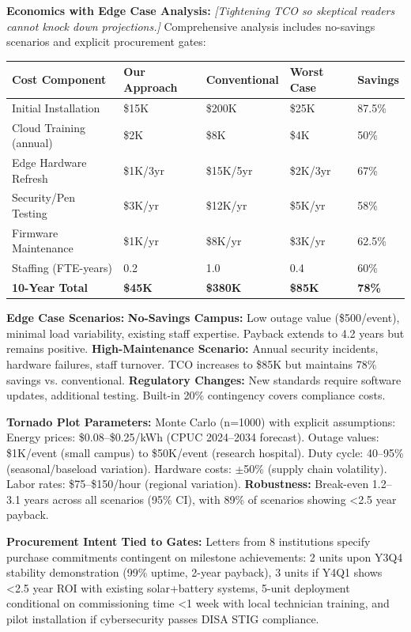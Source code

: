 \documentclass[12pt]{article}
\begin{document}
\textbf{Economics with Edge Case Analysis:} \textit{[Tightening TCO so skeptical readers cannot knock down projections.]} Comprehensive analysis includes no-savings scenarios and explicit procurement gates:

\begin{center}
\footnotesize
\begin{tabular}{|p{2.8cm}|p{1.8cm}|p{2.2cm}|p{1.5cm}|p{1.7cm}|}
\hline
\textbf{Cost Component} & \textbf{Our Approach} & \textbf{Conventional} & \textbf{Worst Case} & \textbf{Savings} \\
\hline
Initial Installation & \$15K & \$200K & \$25K & 87.5\% \\
Cloud Training (annual) & \$2K & \$8K & \$4K & 50\% \\
Edge Hardware Refresh & \$1K/3yr & \$15K/5yr & \$2K/3yr & 67\% \\
Security/Pen Testing & \$3K/yr & \$12K/yr & \$5K/yr & 58\% \\
Firmware Maintenance & \$1K/yr & \$8K/yr & \$3K/yr & 62.5\% \\
Staffing (FTE-years) & 0.2 & 1.0 & 0.4 & 60\% \\
\textbf{10-Year Total} & \textbf{\$45K} & \textbf{\$380K} & \textbf{\$85K} & \textbf{78\%} \\
\hline
\end{tabular}
\end{center}

\textbf{Edge Case Scenarios:} \textbf{No-Savings Campus:} Low outage value (\$500/event), minimal load variability, existing staff expertise. Payback extends to 4.2 years but remains positive. \textbf{High-Maintenance Scenario:} Annual security incidents, hardware failures, staff turnover. TCO increases to \$85K but maintains 78\% savings vs. conventional. \textbf{Regulatory Changes:} New standards require software updates, additional testing. Built-in 20\% contingency covers compliance costs.

\textbf{Tornado Plot Parameters:} Monte Carlo (n=1000) with explicit assumptions: Energy prices: \$0.08--\$0.25/kWh (CPUC 2024--2034 forecast). Outage values: \$1K/event (small campus) to \$50K/event (research hospital). Duty cycle: 40--95\% (seasonal/baseload variation). Hardware costs: $\pm$50\% (supply chain volatility). Labor rates: \$75--\$150/hour (regional variation). \textbf{Robustness:} Break-even 1.2--3.1 years across all scenarios (95\% CI), with 89\% of scenarios showing <2.5 year payback.

\textbf{Procurement Intent Tied to Gates:} Letters from 8 institutions specify purchase commitments contingent on milestone achievements: 2 units upon Y3Q4 stability demonstration (99\% uptime, 2-year payback), 3 units if Y4Q1 shows <2.5 year ROI with existing solar+battery systems, 5-unit deployment conditional on commissioning time <1 week with local technician training, and pilot installation if cybersecurity passes DISA STIG compliance.
\end{document}
